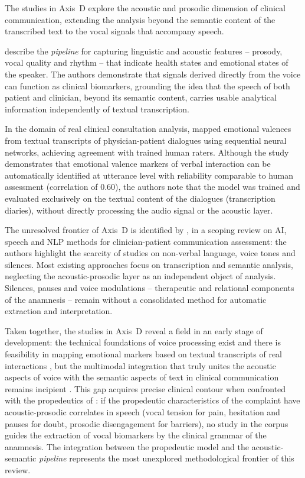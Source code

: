 \documentclass[review,12pt]{elsarticle}
\begin{document}
The studies in Axis~D explore the acoustic and prosodic dimension of clinical
communication, extending the analysis beyond the semantic content of the
transcribed text to the vocal signals that accompany speech.

\citet{Fagherazzi2021} describe the \textit{pipeline} for capturing linguistic
and acoustic features -- prosody, vocal quality and rhythm -- that indicate
health states and emotional states of the speaker. The authors demonstrate
that signals derived directly from the voice can function as clinical
biomarkers, grounding the idea that the speech of both patient and clinician,
beyond its semantic content, carries usable analytical information
independently of textual transcription.

In the domain of real clinical consultation analysis, \citet{Imel2022} mapped
emotional valences from textual transcripts of physician-patient dialogues
using sequential neural networks, achieving agreement with trained human
raters. Although the study demonstrates that emotional valence markers of
verbal interaction can be automatically identified at utterance level with
reliability comparable to human assessment (correlation of 0.60), the authors
note that the model was trained and evaluated exclusively on the textual
content of the dialogues (transcription diaries), without directly processing
the audio signal or the acoustic layer.

The unresolved frontier of Axis~D is identified by \citet{Albert2024}, in a
scoping review on AI, speech and NLP methods for clinician-patient
communication assessment: the authors highlight the scarcity of studies on
non-verbal language, voice tones and silences. Most existing approaches focus
on transcription and semantic analysis, neglecting the acoustic-prosodic layer
as an independent object of analysis. Silences, pauses and voice modulations --
therapeutic and relational components of the anamnesis -- remain without a
consolidated method for automatic extraction and interpretation.

Taken together, the studies in Axis~D reveal a field in an early stage of
development: the technical foundations of voice processing exist
\citep{Fagherazzi2021} and there is feasibility in mapping emotional markers
based on textual transcripts of real interactions \citep{Imel2022}, but the
multimodal integration that truly unites the acoustic aspects of voice with
the semantic aspects of text in clinical communication remains incipient
\citep{Albert2024}. This gap acquires precise clinical contour when confronted
with the propedeutics of \citet{Porto2019}: if the propedeutic characteristics
of the complaint have acoustic-prosodic correlates in speech (vocal tension for
pain, hesitation and pauses for doubt, prosodic disengagement for barriers),
no study in the corpus guides the extraction of vocal biomarkers by the
clinical grammar of the anamnesis. The integration between the propedeutic
model and the acoustic-semantic \textit{pipeline} represents the most
unexplored methodological frontier of this review.
\end{document}
